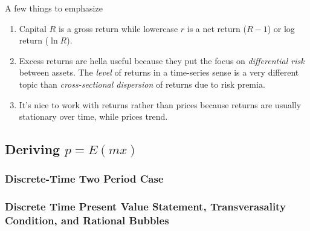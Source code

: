 \documentclass[12pt]{article}
\theoremstyle{plain}
\theoremstyle{definition}
\theoremstyle{remark}
\begin{document}
A few things to emphasize
\begin{enumerate}
  \item Capital $R$ is a gross return while lowercase $r$ is a net
    return ($R-1$) or log return ($\ln R$).
  \item Excess returns are hella useful because they put the focus on
    \emph{differential risk} between assets. The \emph{level} of returns
    in a time-series sense is a very different topic than
    \emph{cross-sectional dispersion} of returns due to risk premia.
  \item It's nice to work with returns rather than prices because
    returns are usually stationary over time, while prices trend.
\end{enumerate}

\newpage
\subsection{Deriving $p=E(mx)$}

\subsubsection{Discrete-Time Two Period Case}



\subsubsection{Discrete Time Present Value Statement, Transverasality
Condition, and Rational Bubbles}
\end{document}

